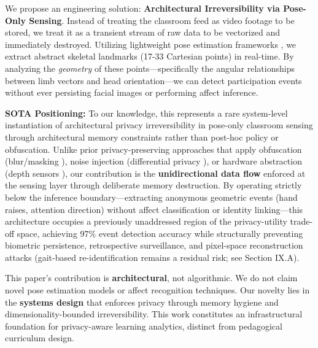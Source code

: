 \documentclass[conference]{IEEEtran}
\begin{document}
We propose an engineering solution: \textbf{Architectural Irreversibility via Pose-Only Sensing}. Instead of treating the classroom feed as video footage to be stored, we treat it as a transient stream of raw data to be vectorized and immediately destroyed. Utilizing lightweight pose estimation frameworks \cite{b6, b10}, we extract abstract skeletal landmarks (17-33 Cartesian points) in real-time. By analyzing the \textit{geometry} of these points—specifically the angular relationships between limb vectors and head orientation—we can detect participation events without ever persisting facial images or performing affect inference.

\textbf{SOTA Positioning:} To our knowledge, this represents a rare system-level instantiation of architectural privacy irreversibility in pose-only classroom sensing through architectural memory constraints rather than post-hoc policy or obfuscation. Unlike prior privacy-preserving approaches that apply obfuscation (blur/masking \cite{b3}), noise injection (differential privacy \cite{b5}), or hardware abstraction (depth sensors \cite{b9}), our contribution is the \textbf{unidirectional data flow} enforced at the sensing layer through deliberate memory destruction. By operating strictly below the inference boundary—extracting anonymous geometric events (hand raises, attention direction) without affect classification or identity linking—this architecture occupies a previously unaddressed region of the privacy-utility trade-off space, achieving 97\% event detection accuracy while structurally preventing biometric persistence, retrospective surveillance, and pixel-space reconstruction attacks (gait-based re-identification remains a residual risk; see Section IX.A).

This paper's contribution is \textbf{architectural}, not algorithmic. We do not claim novel pose estimation models or affect recognition techniques. Our novelty lies in the \textbf{systems design} that enforces privacy through memory hygiene and dimensionality-bounded irreversibility. This work constitutes an infrastructural foundation for privacy-aware learning analytics, distinct from pedagogical curriculum design.
\end{document}
